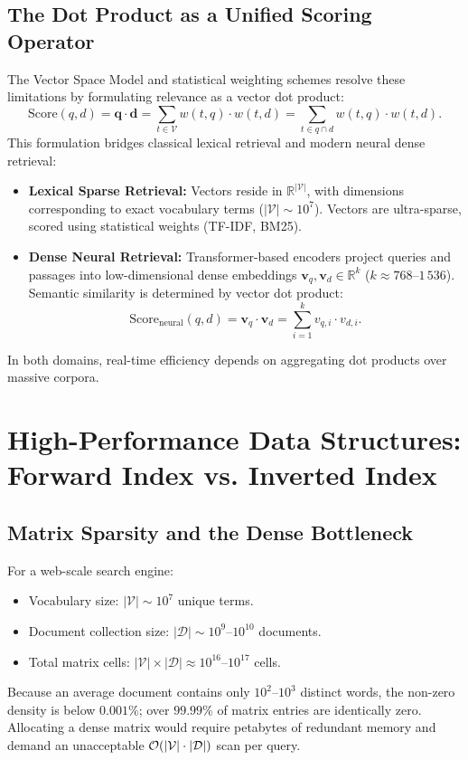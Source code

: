 \subsection{The Dot Product as a Unified Scoring Operator}
The Vector Space Model and statistical weighting schemes resolve these limitations by formulating relevance as a vector dot product:
\begin{equation}
\text{Score}(q, d) = \mathbf{q} \cdot \mathbf{d} = \sum_{t \in \mathcal{V}} w(t, q) \cdot w(t, d) = \sum_{t \in q \cap d} w(t, q) \cdot w(t, d).
\label{eq:dot-product-en}
\end{equation}
This formulation bridges classical lexical retrieval and modern neural dense retrieval:
\begin{itemize}
    \item \textbf{Lexical Sparse Retrieval:} Vectors reside in $\mathbb{R}^{|\mathcal{V}|}$, with dimensions corresponding to exact vocabulary terms ($|\mathcal{V}| \sim 10^7$). Vectors are ultra-sparse, scored using statistical weights (TF-IDF, BM25).
    \item \textbf{Dense Neural Retrieval:} Transformer-based encoders project queries and passages into low-dimensional dense embeddings $\mathbf{v}_q, \mathbf{v}_d \in \mathbb{R}^k$ ($k \approx 768\text{--}1\,536$). Semantic similarity is determined by vector dot product:
    \begin{equation}
    \text{Score}_{\text{neural}}(q, d) = \mathbf{v}_q \cdot \mathbf{v}_d = \sum_{i=1}^k v_{q,i} \cdot v_{d,i}.
    \end{equation}
\end{itemize}
In both domains, real-time efficiency depends on aggregating dot products over massive corpora.

\FloatBarrier
\section{High-Performance Data Structures: Forward Index vs. Inverted Index}
\label{sec:forward-vs-inverted-en}

\subsection{Matrix Sparsity and the Dense Bottleneck}
For a web-scale search engine:
\begin{itemize}
    \item Vocabulary size: $|\mathcal{V}| \sim 10^7$ unique terms.
    \item Document collection size: $|\mathcal{D}| \sim 10^9 \text{--} 10^{10}$ documents.
    \item Total matrix cells: $|\mathcal{V}| \times |\mathcal{D}| \approx 10^{16} \text{--} 10^{17}$ cells.
\end{itemize}
Because an average document contains only $10^2\text{--}10^3$ distinct words, the non-zero density is below $0.001\%$; over $99.99\%$ of matrix entries are identically zero. Allocating a dense matrix would require petabytes of redundant memory and demand an unacceptable $\mathcal{O}\!\left(|\mathcal{V}| \cdot |\mathcal{D}|\right)$ scan per query.

